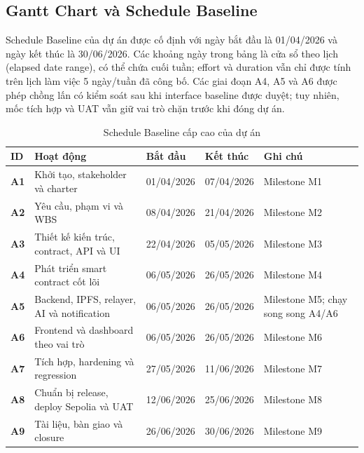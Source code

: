 \subsection{Gantt Chart và Schedule Baseline}

Schedule Baseline của dự án được cố định với ngày bắt đầu là 01/04/2026 và ngày kết thúc là 30/06/2026. Các khoảng ngày trong bảng là cửa sổ theo lịch (elapsed date range), có thể chứa cuối tuần; effort và duration vẫn chỉ được tính trên lịch làm việc 5 ngày/tuần đã công bố. Các giai đoạn A4, A5 và A6 được phép chồng lấn có kiểm soát sau khi interface baseline được duyệt; tuy nhiên, mốc tích hợp và UAT vẫn giữ vai trò chặn trước khi đóng dự án.

\begin{table}[H]
\centering
\caption{Schedule Baseline cấp cao của dự án}
\label{tab:schedule-baseline}
\begin{tabularx}{\textwidth}{| >{\bfseries}p{1.1cm} | p{5.5cm} | p{2.6cm} | p{2.6cm} | X |}
\hline
ID & Hoạt động & Bắt đầu & Kết thúc & Ghi chú \\
\hline
A1 & Khởi tạo, stakeholder và charter & 01/04/2026 & 07/04/2026 & Milestone M1 \\ \hline
A2 & Yêu cầu, phạm vi và WBS & 08/04/2026 & 21/04/2026 & Milestone M2 \\ \hline
A3 & Thiết kế kiến trúc, contract, API và UI & 22/04/2026 & 05/05/2026 & Milestone M3 \\ \hline
A4 & Phát triển smart contract cốt lõi & 06/05/2026 & 26/05/2026 & Milestone M4 \\ \hline
A5 & Backend, IPFS, relayer, AI và notification & 06/05/2026 & 26/05/2026 & Milestone M5; chạy song song A4/A6 \\ \hline
A6 & Frontend và dashboard theo vai trò & 06/05/2026 & 26/05/2026 & Milestone M6 \\ \hline
A7 & Tích hợp, hardening và regression & 27/05/2026 & 11/06/2026 & Milestone M7 \\ \hline
A8 & Chuẩn bị release, deploy Sepolia và UAT & 12/06/2026 & 25/06/2026 & Milestone M8 \\ \hline
A9 & Tài liệu, bàn giao và closure & 26/06/2026 & 30/06/2026 & Milestone M9 \\
\hline
\end{tabularx}
\end{table}


